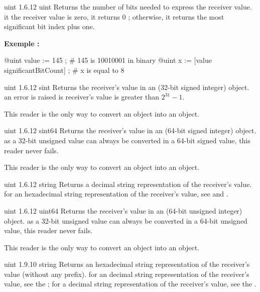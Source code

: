 {uint}
{1.6.12}
{uint}
{Returns the number of bits needed to express the receiver value.}
{it the receiver value is zero, it returns 0 ; otherwise, it returns the most significant bit index plus one.}

\textbf{Exemple :}
\begin{galgascode}
@uint value := 145 ; # 145 is 10010001 in binary
@uint x := [value significantBitCount] ; # x is equal to 8
\end{galgascode}






{uint}
{1.6.12}
{sint}
{Returns the receiver's value in an  (32-bit signed integer) object.}
{an error is raised is receiver's value is greater than $2^{31}-1$.}

This reader is the only way to convert an  object into an  object.




{uint}
{1.6.12}
{sint64}
{Returns the receiver's value in an  (64-bit signed integer) object.}
{as a 32-bit unsigned value can always be converted in a 64-bit signed value, this reader never fails.}

This reader is the only way to convert an  object into an  object.


{uint}
{1.6.12}
{string}
{Returns a decimal string representation of the receiver's value.}
{for an hexadecimal string representation of the receiver's value, see  and .}




{uint}
{1.6.12}
{uint64}
{Returns the receiver's value in an  (64-bit unsigned integer) object.}
{as a 32-bit unsigned value can always be converted in a 64-bit unsigned value, this reader never fails.}

This reader is the only way to convert an  object into an  object.




{uint}
{1.9.10}
{string}
{Returns an hexadecimal string representation of the receiver's value (without any prefix).}
{for an decimal string representation of the receiver's value, see the ; for a decimal string representation of the receiver's value, see the .}






